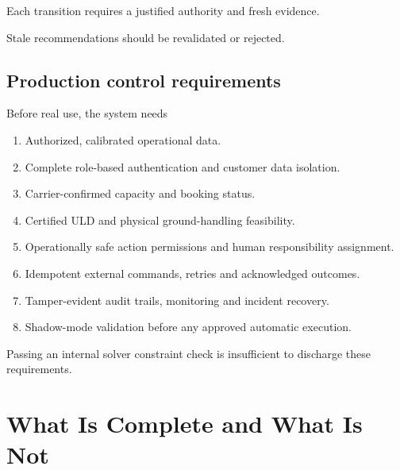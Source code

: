 \documentclass[10pt,a4paper]{article}
\theoremstyle{plain}
\theoremstyle{definition}
\theoremstyle{remark}
\begin{document}
Each transition requires
a justified authority and
fresh evidence.

Stale recommendations should be
revalidated or rejected.

\subsection{Production control requirements}

Before real use, the system needs

\begin{enumerate}[
  label=\textbf{G\arabic*.},
  leftmargin=20pt,
  itemsep=3pt
]
\item
Authorized, calibrated operational data.
\item
Complete role-based authentication
and customer data isolation.
\item
Carrier-confirmed capacity
and booking status.
\item
Certified ULD and physical
ground-handling feasibility.
\item
Operationally safe action permissions
and human responsibility assignment.
\item
Idempotent external commands,
retries and acknowledged outcomes.
\item
Tamper-evident audit trails,
monitoring and incident recovery.
\item
Shadow-mode validation before
any approved automatic execution.
\end{enumerate}

Passing an internal solver
constraint check is insufficient
to discharge these requirements.

\section{What Is Complete and What Is Not}
\end{document}
